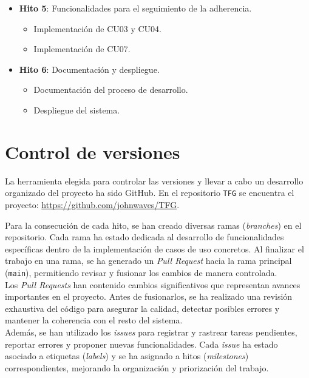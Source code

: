 \begin{itemize}
	\item \textbf{Hito 5}: Funcionalidades para el seguimiento de la adherencia.
	\begin{itemize}
		\item Implementación de CU03 y CU04.
		\item Implementación de CU07.
	\end{itemize}

	\item \textbf{Hito 6}: Documentación y despliegue.
	\begin{itemize}
		\item Documentación del proceso de desarrollo.
		\item Despliegue del sistema.
	\end{itemize}
\end{itemize}


\section{Control de versiones}
La herramienta elegida para controlar las versiones y llevar a cabo un desarrollo organizado del proyecto ha sido GitHub. En el repositorio \texttt{TFG} se encuentra el proyecto: \url{https://github.com/johnwaves/TFG}.

Para la consecución de cada hito, se han creado diversas ramas (\textit{branches}) en el repositorio. Cada rama ha estado dedicada al desarrollo de funcionalidades específicas dentro de la implementación de casos de uso concretos. Al finalizar el trabajo en una rama, se ha generado un \textit{Pull Request} hacia la rama principal (\texttt{main}), permitiendo revisar y fusionar los cambios de manera controlada. \\

Los \textit{Pull Requests} han contenido cambios significativos que representan avances importantes en el proyecto. Antes de fusionarlos, se ha realizado una revisión exhaustiva del código para asegurar la calidad, detectar posibles errores y mantener la coherencia con el resto del sistema. \\

Además, se han utilizado los \textit{issues} para registrar y rastrear tareas pendientes, reportar errores y proponer nuevas funcionalidades. Cada \textit{issue} ha estado asociado a etiquetas (\textit{labels}) y se ha asignado a hitos (\textit{milestones}) correspondientes, mejorando la organización y priorización del trabajo.


